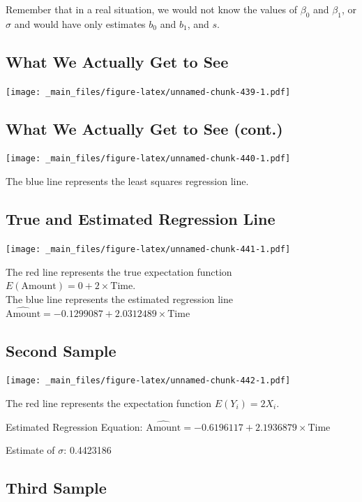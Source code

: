 \documentclass[]{book}
\begin{document}
Remember that in a real situation, we would not know the values of
\(\beta_0\) and \(\beta_1\), or \(\sigma\) and would have only estimates
\(b_0\) and \(b_1\), and \(s\).

\subsection{What We Actually Get to
See}\label{what-we-actually-get-to-see-1}

\texttt{[image: \_main\_files/figure-latex/unnamed-chunk-439-1.pdf]}

\subsection{What We Actually Get to See
(cont.)}\label{what-we-actually-get-to-see-cont.-1}

\texttt{[image: \_main\_files/figure-latex/unnamed-chunk-440-1.pdf]}

The blue line represents the least squares regression line.

\subsection{True and Estimated Regression
Line}\label{true-and-estimated-regression-line}

\texttt{[image: \_main\_files/figure-latex/unnamed-chunk-441-1.pdf]}

The red line represents the true expectation function
\(E(\text{Amount}) = 0 + 2\times\text{Time}\).\\
The blue line represents the estimated regression line
\(\widehat{\text{Amount}} = -0.1299087 + 2.0312489\times\text{Time}\)

\subsection{Second Sample}\label{second-sample}

\texttt{[image: \_main\_files/figure-latex/unnamed-chunk-442-1.pdf]}

The red line represents the expectation function \(E(Y_i) = 2X_i\).

Estimated Regression Equation:
\(\widehat{\text{Amount}} = -0.6196117 + 2.1936879\times \text{Time}\)

Estimate of \(\sigma\): 0.4423186

\subsection{Third Sample}\label{third-sample}
\end{document}
